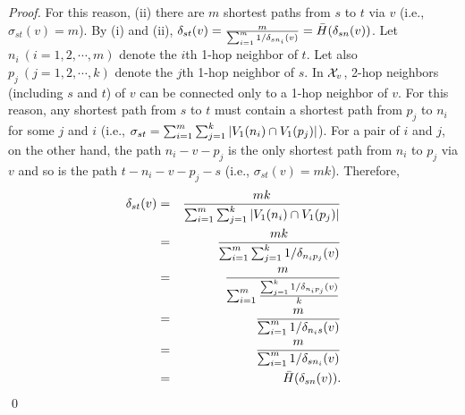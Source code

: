 \begin{theorem}
\begin{proof}
For this reason, (ii) there are $m$ shortest paths from $s$ to $t$ via $v$ (i.e., $\sigma_{st}(v)=m$).
By (i) and (ii), $\D{s}{t}{v} = \frac{m}{\sum_{i=1}^m 1/\D{s}{n_i}{v}} = \bar{H}(\D{s}{n}{v})$.
Let $n_i~(i=1,2,\cdots,m)$ denote the $i$th 1-hop neighbor of $t$. 
Let also $p_j~(j=1,2,\cdots,k)$ denote the $j$th 1-hop neighbor of $s$.
In $\XN{v}$, 2-hop neighbors (including $s$ and $t$) of $v$ can be connected only to a 1-hop neighbor of $v$.
For this reason, any shortest path from $s$ to $t$ must contain a shortest path from $p_j$ to $n_i$ for some $j$ and $i$ 
(i.e., $\sigma_{st} = \sum_{i=1}^m \sum_{j=1}^k |\V{n_i}{1} \cap \V{p_j}{1}|$). 
For a pair of $i$ and $j$, on the other hand, the path $n_i-v-p_j$ is the only shortest path from $n_i$ to $p_j$ via $v$ and so is the path $t-n_i-v-p_j-s$ (i.e., $\sigma_{st}(v)=mk$). 
Therefore, 
\begin{eqnarray}
\D{s}{t}{v} 
&=& \frac{mk}{\sum_{i=1}^m \sum_{j=1}^k |\V{n_i}{1} \cap \V{p_j}{1}|} \nonumber \\ 
&=& \frac{mk}{\sum_{i=1}^m \sum_{j=1}^k 1/\D{n_i}{p_j}{v}} \nonumber \\ 
&=& \frac{m}{\sum_{i=1}^m \frac {\sum_{j=1}^k 1/\D{n_i}{p_j}{v}}{k}} \nonumber \\ 
&=& \frac{m}{\sum_{i=1}^m 1/\D{n_i}{s}{v}} \nonumber \\ 
&=& \frac{m}{\sum_{i=1}^m 1/\D{s}{n_i}{v}} \nonumber  \\
&=& \bar{H}(\D{s}{n}{v}).   \nonumber
\end{eqnarray}\qed
\label{harmonic_eq}
\end{proof}
\end{theorem}
